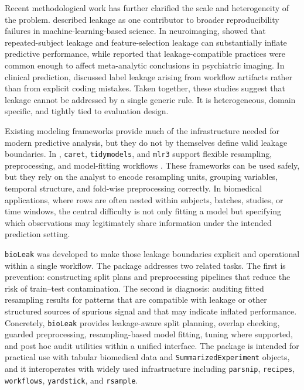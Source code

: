 \documentclass[article]{jss}
\begin{document}
Recent methodological work has further clarified the scale and heterogeneity of the problem. \citet{kapoor2023} described leakage as one contributor to broader reproducibility failures in machine-learning-based science. In neuroimaging, \citet{rosenblatt2024} showed that repeated-subject leakage and feature-selection leakage can substantially inflate predictive performance, while \citet{vandemortel2025} reported that leakage-compatible practices were common enough to affect meta-analytic conclusions in psychiatric imaging. In clinical prediction, \citet{davis2024} discussed label leakage arising from workflow artifacts rather than from explicit coding mistakes. Taken together, these studies suggest that leakage cannot be addressed by a single generic rule. It is heterogeneous, domain specific, and tightly tied to evaluation design.

Existing modeling frameworks provide much of the infrastructure needed for modern predictive analysis, but they do not by themselves define valid leakage boundaries. In  \citep{R}, \texttt{caret}, \texttt{tidymodels}, and \texttt{mlr3} support flexible resampling, preprocessing, and model-fitting workflows \citep{kuhn2008, kuhn2020, lang2019, bischl2024}. These frameworks can be used safely, but they rely on the analyst to encode resampling units, grouping variables, temporal structure, and fold-wise preprocessing correctly. In biomedical applications, where rows are often nested within subjects, batches, studies, or time windows, the central difficulty is not only fitting a model but specifying which observations may legitimately share information under the intended prediction setting.

\texttt{bioLeak} was developed to make those leakage boundaries explicit and operational within a single workflow. The package addresses two related tasks. The first is prevention: constructing split plans and preprocessing pipelines that reduce the risk of train--test contamination. The second is diagnosis: auditing fitted resampling results for patterns that are compatible with leakage or other structured sources of spurious signal and that may indicate inflated performance. Concretely, \texttt{bioLeak} provides leakage-aware split planning, overlap checking, guarded preprocessing, resampling-based model fitting, tuning where supported, and post hoc audit utilities within a unified  interface. The package is intended for practical use with tabular biomedical data and \texttt{SummarizedExperiment} objects, and it interoperates with widely used  infrastructure including \texttt{parsnip}, \texttt{recipes}, \texttt{workflows}, \texttt{yardstick}, and \texttt{rsample}.
\end{document}
